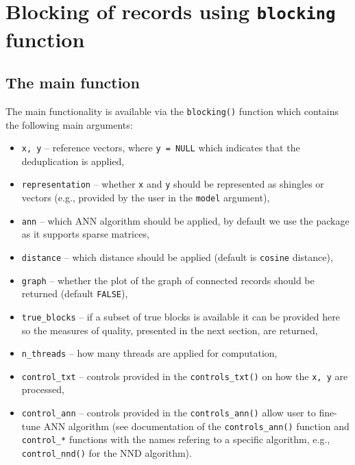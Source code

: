 \section{\texorpdfstring{Blocking of records using \texttt{blocking} function}{Blocking of records using blocking function}}\label{sec-blocks}

\subsection{The main function}\label{the-main-function}

The main functionality is available via the \texttt{blocking()} function which
contains the following main arguments:

\begin{itemize}
\tightlist
\item
  \texttt{x,\ y} -- reference vectors, where \texttt{y\ =\ NULL} which indicates that
  the deduplication is applied,
\item
  \texttt{representation} -- whether \texttt{x} and \texttt{y} should be represented as
  shingles or vectors (e.g., provided by the user in the \texttt{model}
  argument),
\item
  \texttt{ann} -- which ANN algorithm should be applied, by default we use the
   package as it supports sparse matrices,
\item
  \texttt{distance} -- which distance should be applied (default is \texttt{cosine} distance),
\item
  \texttt{graph} -- whether the plot of the graph of connected records should
  be returned (default \texttt{FALSE}),
\item
  \texttt{true\_blocks} -- if a subset of true blocks is available it can be
  provided here so the measures of quality, presented in the next
  section, are returned,
\item
  \texttt{n\_threads} -- how many threads are applied for computation,
\item
  \texttt{control\_txt} -- controls provided in the \texttt{controls\_txt()} on how
  the \texttt{x,\ y} are processed,
\item
  \texttt{control\_ann} -- controls provided in the \texttt{controls\_ann()} allow
  user to fine-tune ANN algorithm (see documentation of the
  \texttt{controls\_ann()} function and \texttt{control\_*} functions with the names
  refering to a specific algorithm, e.g., \texttt{control\_nnd()} for the NND
  algorithm).
\end{itemize}

